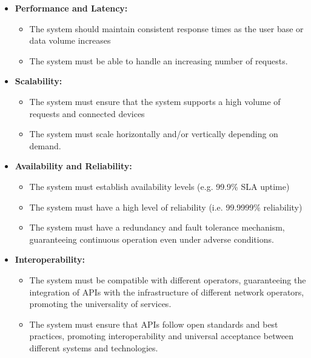 \begin{itemize}
  \item \textbf{Performance and Latency:}
    \begin{itemize}
      \item The system should maintain consistent response times as the user base or data volume increases 

      \item The system must be able to handle an increasing number of requests.
    \end{itemize}

  \item \textbf{Scalability:}
    \begin{itemize}
      \item The system must ensure that the system supports a high volume of requests and connected devices

      \item The system must scale horizontally and/or vertically depending on demand.
    \end{itemize}

  \item \textbf{Availability and Reliability:}
    \begin{itemize} 
      \item The system must establish availability levels (e.g. 99.9\% SLA
        uptime) 

      \item The system must have a high level of reliability (i.e. 99.9999\%
        reliability)

      \item The system must have a redundancy and fault tolerance mechanism,
        guaranteeing continuous operation even under adverse conditions.
    \end{itemize}

  \item  \textbf{Interoperability:}
    \begin{itemize}
      \item The system must be compatible with different operators,
        guaranteeing the integration of APIs with the infrastructure of
        different network operators, promoting the universality of services.

      \item The system must ensure that APIs follow open standards and best
        practices, promoting interoperability and universal acceptance between
        different systems and technologies.
    \end{itemize}



\end{itemize}
